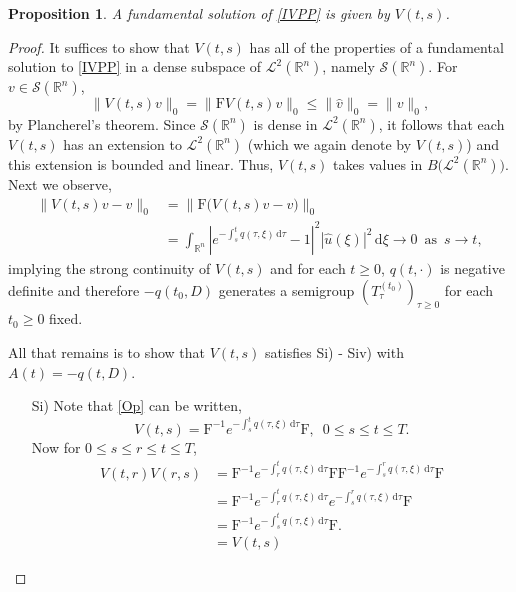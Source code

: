\documentclass[a4paper, 12pt]{report}
\theoremstyle{cor}
\newtheorem{prop}[theorem]{Proposition}
\theoremstyle{remark}
\theoremstyle{definition}
\begin{document}
\begin{prop}\label{TDSFSP2}
A fundamental solution of \eqref{IVPP} is given by $V(t, s)$.
\end{prop}
\begin{proof}
It suffices to show that $V(t, s)$ has all of the properties of a fundamental solution to \eqref{IVPP} in a dense subspace of $\mathcal{L}^2(\mathbb{R}^n)$, namely $\mathcal{S}(\mathbb{R}^n)$.  For $v \in \mathcal{S}(\mathbb{R}^n)$,
$$
\big\|V(t, s)v\big\|_0 = \big\|\mathrm{F}V(t, s)v\big\|_0 \le \|\hat{v}\|_0 = \|v\|_0,
$$
by Plancherel's theorem.  Since $\mathcal{S}(\mathbb{R}^n)$ is dense in $\mathcal{L}^2(\mathbb{R}^n)$, it follows that each $V(t, s)$ has an extension to $\mathcal{L}^2(\mathbb{R}^n)$ (which we again denote by $V(t, s)$) and this extension is bounded and linear.  Thus, $V(t, s)$ takes values in $B\big(\mathcal{L}^2(\mathbb{R}^n)\big)$.  Next we observe,
\begin{align}
\|V(t, s)v - v\|_0 & = \big\|\mathrm{F}\big(V(t, s)v - v\big)\big\|_0\nonumber\\
& = \int_{\mathbb{R}^n}\left|e^{-\int_s^tq(\tau, \xi)\,\mathrm{d}\tau} - 1\right|^2|\hat{u}(\xi)|^2\,\mathrm{d}\xi \to 0 \,\,\, \text{as} \,\,\, s \to t,\nonumber
\end{align}
implying the strong continuity of $V(t, s)$ and for each $t \ge 0$, $q(t, \cdot)$ is negative definite and therefore $-q(t_0, D)$ generates a semigroup $(T_\tau^{(t_0)})_{\tau \ge 0}$ for each $t_0 \ge 0$ fixed.

All that remains is to show that $V(t, s)$ satisfies Si) - Siv) with $A(t) = -q(t, D)$.
\begin{itemize}

\item[Si)] Note that \eqref{Op} can be written,
$$
V(t, s) = \mathrm{F}^{-1}e^{-\int_s^tq(\tau, \xi)\,\mathrm{d}\tau}\mathrm{F}, \,\,\, 0 \le s \le t \le T.
$$
Now for $0 \le s \le r \le t \le T$,
\begin{align}
V(t, r)V(r, s) & = \mathrm{F}^{-1}e^{-\int_r^tq(\tau, \xi)\,\mathrm{d}\tau}\mathrm{F}\mathrm{F}^{-1}e^{-\int_s^rq(\tau, \xi)\,\mathrm{d}\tau}\mathrm{F}\nonumber\\
& = \mathrm{F}^{-1}e^{-\int_r^tq(\tau, \xi)\,\mathrm{d}\tau}e^{-\int_s^rq(\tau, \xi)\,\mathrm{d}\tau}\mathrm{F}\nonumber\\
& = \mathrm{F}^{-1}e^{-\int_s^tq(\tau, \xi)\,\mathrm{d}\tau}\mathrm{F}.\nonumber\\
& = V(t, s)\nonumber
\end{align}


\end{itemize}
\end{proof}
\end{document}
